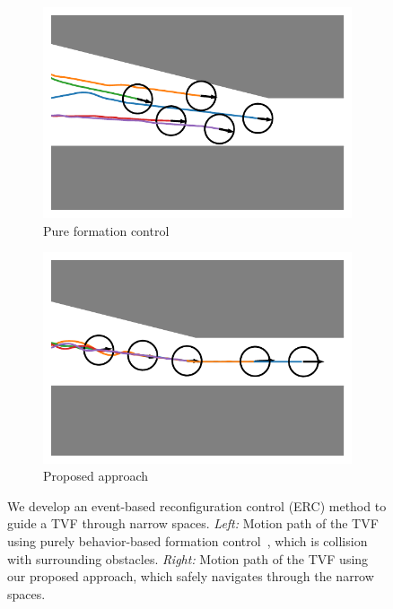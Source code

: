 \begin{figure}
\centering
\begin{subfigure}[b]{0.4\textwidth}
    
    \centering
    \includegraphics[width=\linewidth]{paper2/images/sample_bc.pdf}
    \caption{Pure formation control}
    \label{fig:1sample_bc}
\end{subfigure}
\begin{subfigure}[b]{0.4\textwidth}
    \centering
    \includegraphics[width=\linewidth]{paper2/images/sample_edc.pdf}
    \caption{Proposed approach}
    \label{fig:1sample_edc}
\end{subfigure}
\caption{We develop an event-based reconfiguration control (ERC) method to guide a TVF through narrow spaces. \textit{Left:} Motion path of the TVF using purely behavior-based formation control~\cite{736776, Vsrhelyi2018}, which is collision with surrounding obstacles. \textit{Right:} Motion path of the TVF using our proposed approach, which safely navigates through the narrow spaces.}
\label{fig:1sample}
\end{figure}

